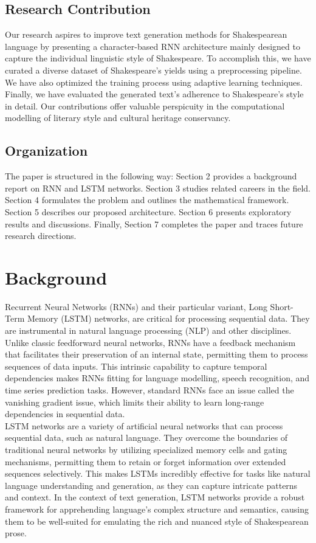 \documentclass[conference]{IEEEtran}
\begin{document}
\subsection{Research Contribution}
Our research aspires to improve text generation methods for Shakespearean language by presenting a character-based RNN architecture mainly designed to capture the individual linguistic style of Shakespeare. To accomplish this, we have curated a diverse dataset of Shakespeare's yields using a preprocessing pipeline. We have also optimized the training process using adaptive learning techniques. Finally, we have evaluated the generated text's adherence to Shakespeare's style in detail. Our contributions offer valuable perspicuity in the computational modelling of literary style and cultural heritage conservancy.\\

\subsection{Organization}
The paper is structured in the following way: Section 2 provides a background report on RNN and LSTM networks. Section 3 studies related careers in the field. Section 4 formulates the problem and outlines the mathematical framework. Section 5 describes our proposed architecture. Section 6 presents exploratory results and discussions. Finally, Section 7 completes the paper and traces future research directions.\\

\section{Background}
Recurrent Neural Networks (RNNs) and their particular variant, Long Short-Term Memory\cite{pandey2023natural} (LSTM) networks, are critical for processing sequential data. They are instrumental in natural language processing (NLP) and other disciplines. Unlike classic feedforward neural networks, RNNs have a feedback mechanism that facilitates their preservation of an internal state, permitting them to process sequences of data inputs. This intrinsic capability to capture temporal dependencies makes RNNs fitting for language modelling, speech recognition, and time series prediction tasks. However, standard RNNs face an issue called the vanishing gradient issue, which limits their ability to learn long-range dependencies in sequential data.\\
LSTM networks are a variety of artificial neural networks that can process sequential data, such as natural language. They overcome the boundaries of traditional neural networks by utilizing specialized memory cells and gating mechanisms, permitting them to retain or forget information over extended sequences selectively. This makes LSTMs incredibly effective for tasks like natural language understanding and generation, as they can capture intricate patterns and context. In the context of text generation, LSTM networks provide a robust framework for apprehending language's complex structure and semantics, causing them to be well-suited for emulating the rich and nuanced style of Shakespearean prose.
\end{document}
